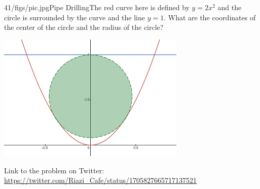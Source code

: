 \begin{problem}{41/figs/pic.jpg}{Pipe Drilling}The red curve here is defined by $y = 2x^2$ and the circle is surrounded by the curve and the line $y=1$. What are the coordinates of the center of the circle and the radius of the circle?

\begin{center}
	\includegraphics[width=9cm]{41/figs/41_pipe.png}
\end{center}

Link to the problem on Twitter: \url{https://twitter.com/Riazi_Cafe/status/1705827665717137521}\end{problem}